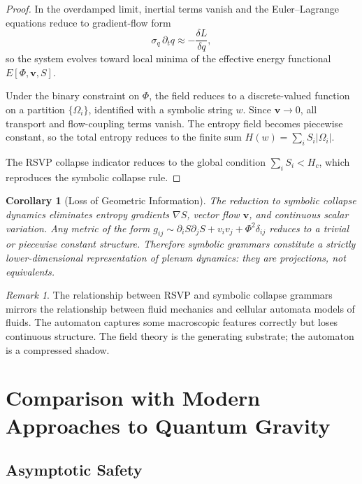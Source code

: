 \documentclass[12pt,a4paper]{article}
\theoremstyle{plain}
\newtheorem{corollary}{Corollary}[theorem]
\theoremstyle{definition}
\theoremstyle{remark}
\newtheorem{remark}{Remark}
\begin{document}
\begin{proof}
In the overdamped limit, inertial terms vanish and the Euler--Lagrange
equations reduce to gradient-flow form
\[
\sigma_q\,\partial_t q \approx -\frac{\delta L}{\delta q},
\]
so the system evolves toward local minima of the effective energy
functional $E[\Phi,\mathbf{v},S]$.

Under the binary constraint on $\Phi$, the field reduces to a
discrete-valued function on a partition $\{\Omega_i\}$, identified with
a symbolic string $w$. Since $\mathbf{v}\to 0$, all transport and
flow-coupling terms vanish. The entropy field becomes piecewise
constant, so the total entropy reduces to the finite sum
$H(w) = \sum_i S_i|\Omega_i|$.

The RSVP collapse indicator reduces to the global condition
$\sum_i S_i < H_c$, which reproduces the symbolic collapse rule.
\end{proof}

\begin{corollary}[Loss of Geometric Information]
The reduction to symbolic collapse dynamics eliminates entropy
gradients $\nabla S$, vector flow $\mathbf{v}$, and continuous scalar
variation. Any metric of the form $g_{ij} \sim \partial_i S\partial_j S
+ v_iv_j + \Phi^2\delta_{ij}$ reduces to a trivial or piecewise
constant structure. Therefore symbolic grammars constitute a strictly
lower-dimensional representation of plenum dynamics: they are
projections, not equivalents.
\end{corollary}

\begin{remark}
The relationship between RSVP and symbolic collapse grammars mirrors
the relationship between fluid mechanics and cellular automata models
of fluids. The automaton captures some macroscopic features correctly
but loses continuous structure. The field theory is the generating
substrate; the automaton is a compressed shadow.
\end{remark}

\section{Comparison with Modern Approaches to Quantum Gravity}

\subsection{Asymptotic Safety}
\end{document}
